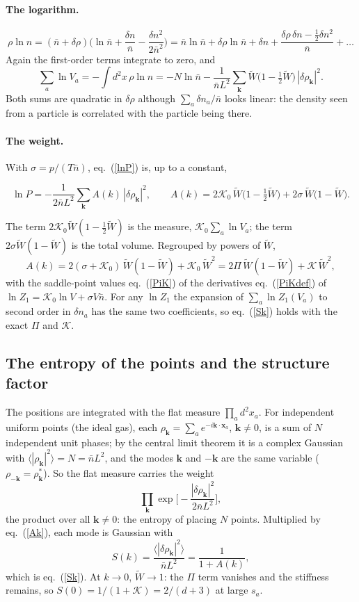 \documentclass[11pt,aps,preprint,nofootinbib,superscriptaddress,tightenlines]{revtex4-2}
\newcommand{\avg}[1]{\langle #1\rangle}
\def\st{\begin{equation}}
\def\stp{\end{equation}}
\def\Eq#1{eq.~(\ref{#1})}
\let\oldparagraph\paragraph
\renewcommand{\paragraph}{\par\bigskip\oldparagraph}
\begin{document}
\paragraph{The logarithm.}
\st
\rho\ln n=(\bar n+\delta\rho)\Big(\ln\bar n+\frac{\delta n}{\bar n}-\frac{\delta n^2}{2\bar n^2}\Big)
=\bar n\ln\bar n+\delta\rho\ln\bar n+\delta n+\frac{\delta\rho\,\delta n-\tfrac12\delta n^2}{\bar n}+\dots
\stp
Again the first-order terms integrate to zero, and
\st
\sum_a\ln V_a=-\int d^2x\,\rho\ln n=-N\ln\bar n-\frac{1}{\bar nL^2}\sum_{\bm k}\widetilde W\big(1-\tfrac12\widetilde W\big)\,|\delta\rho_{\bm k}|^2 .
\stp
Both sums are quadratic in $\delta\rho$ although $\sum_a\delta n_a/\bar n$ looks linear: the density seen from a particle is correlated with the
particle being there.

\paragraph{The weight.}  With $\sigma=p/(T\bar n)$, \Eq{lnP} is, up to a constant,
\begin{keyeq}
\st
\ln P=-\frac{1}{2\bar nL^2}\sum_{\bm k}A(k)\,|\delta\rho_{\bm k}|^2,\qquad
A(k)=2\mathcal K_0\,\widetilde W\big(1-\tfrac12\widetilde W\big)+2\sigma\,\widetilde W\big(1-\widetilde W\big) .
\label{Ak}
\stp
\end{keyeq}
The term $2\mathcal K_0\widetilde W(1-\tfrac12\widetilde W)$ is the measure, $\mathcal K_0\sum_a\ln V_a$; the term $2\sigma\widetilde W(1-\widetilde W)$ is the total volume.
Regrouped by powers of $\widetilde W$,
\st
A(k)=2(\sigma+\mathcal K_0)\,\widetilde W(1-\widetilde W)+\mathcal K_0\,\widetilde W^2=2\Pi\,\widetilde W(1-\widetilde W)+\mathcal K\,\widetilde W^2 ,
\stp
with the saddle-point values \Eq{PiK} of the derivatives \Eq{PiKdef} of $\ln Z_1=\mathcal K_0\ln V+\sigma V\bar n$.  For any $\ln Z_1$ the expansion of
$\sum_a\ln Z_1(V_a)$ to second order in $\delta n_a$ has the same two coefficients, so \Eq{Sk} holds with the exact $\Pi$ and $\mathcal K$.

\subsection{The entropy of the points and the structure factor}
\label{app:Sk}

The positions are integrated with the flat measure $\prod_ad^2x_a$.  For independent uniform points (the ideal gas), each
$\rho_{\bm k}=\sum_ae^{-i\bm k\cdot\bm x_a}$, $\bm k\neq0$, is a sum of $N$ independent unit phases; by the central limit theorem it is a complex
Gaussian with $\avg{|\rho_{\bm k}|^2}=N=\bar nL^2$, and the modes $\bm k$ and $-\bm k$ are the same variable ($\rho_{-\bm k}=\rho_{\bm k}^*$).  So the flat
measure carries the weight
\st
\prod_{\bm k}\exp\Big[-\frac{|\delta\rho_{\bm k}|^2}{2\bar nL^2}\Big],
\stp
the product over all $\bm k\neq0$: the entropy of placing $N$ points.  Multiplied by \Eq{Ak}, each mode is Gaussian with
\st
S(k)=\frac{\avg{|\delta\rho_{\bm k}|^2}}{\bar nL^2}=\frac{1}{1+A(k)},
\stp
which is \Eq{Sk}.  At $k\to0$, $\widetilde W\to1$: the $\Pi$ term vanishes and the stiffness remains, so $S(0)=1/(1+\mathcal K)=2/(d+3)$ at large $s_a$.
\end{document}
